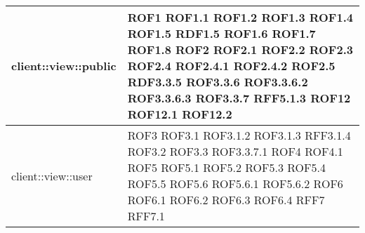 \begin{center}
\begin{longtable}{| p{9cm} | p{4cm} |}
client::view::public  &  ROF1 \newline ROF1.1 \newline ROF1.2 \newline ROF1.3 \newline ROF1.4 \newline ROF1.5 \newline RDF1.5 \newline ROF1.6 \newline ROF1.7 \newline ROF1.8 \newline ROF2 \newline ROF2.1 \newline ROF2.2 \newline ROF2.3 \newline ROF2.4 \newline ROF2.4.1 \newline ROF2.4.2 \newline ROF2.5 \newline RDF3.3.5 \newline ROF3.3.6 \newline ROF3.3.6.2 \newline ROF3.3.6.3  \newline ROF3.3.7 \newline RFF5.1.3 \newline ROF12 \newline ROF12.1 \newline ROF12.2 \newline \\
\hline
client::view::user  &  ROF3 \newline ROF3.1 \newline ROF3.1.2 \newline ROF3.1.3 \newline RFF3.1.4 \newline ROF3.2 \newline ROF3.3 \newline ROF3.3.7.1 \newline ROF4 \newline ROF4.1 \newline ROF5 \newline ROF5.1 \newline ROF5.2 \newline ROF5.3 \newline ROF5.4 \newline ROF5.5  \newline ROF5.6 \newline ROF5.6.1 \newline ROF5.6.2 \newline ROF6 \newline ROF6.1 \newline ROF6.2 \newline ROF6.3 \newline ROF6.4 \newline RFF7 \newline RFF7.1 \newline \\

\end{longtable}
\end{center}
